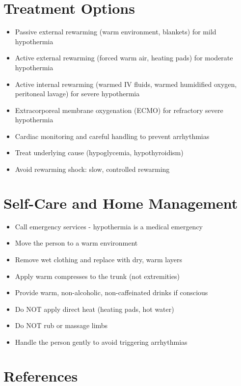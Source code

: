 \section*{Treatment Options}
\begin{itemize}
\item Passive external rewarming (warm environment, blankets) for mild hypothermia
\item Active external rewarming (forced warm air, heating pads) for moderate hypothermia
\item Active internal rewarming (warmed IV fluids, warmed humidified oxygen, peritoneal lavage) for severe hypothermia
\item Extracorporeal membrane oxygenation (ECMO) for refractory severe hypothermia
\item Cardiac monitoring and careful handling to prevent arrhythmias
\item Treat underlying cause (hypoglycemia, hypothyroidism)
\item Avoid rewarming shock: slow, controlled rewarming
\end{itemize}

\section*{Self-Care and Home Management}
\begin{itemize}
\item Call emergency services - hypothermia is a medical emergency
\item Move the person to a warm environment
\item Remove wet clothing and replace with dry, warm layers
\item Apply warm compresses to the trunk (not extremities)
\item Provide warm, non-alcoholic, non-caffeinated drinks if conscious
\item Do NOT apply direct heat (heating pads, hot water)
\item Do NOT rub or massage limbs
\item Handle the person gently to avoid triggering arrhythmias
\end{itemize}

\section*{References}

